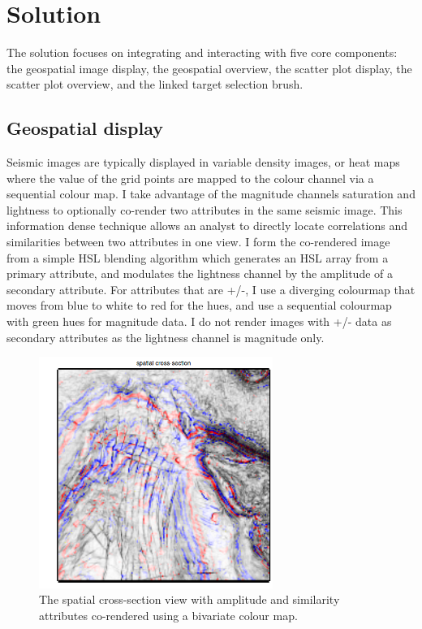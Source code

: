 \documentclass[journal]{vgtc}                %
\begin{document}
\section{Solution}
The solution focuses on integrating and interacting with five core components:
the geospatial image display, the geospatial overview, the scatter plot display,
the scatter plot overview, and the linked target selection brush. 

\subsection{Geospatial display}
Seismic images are typically displayed in variable density images, or heat maps where
the value of the grid points are mapped to the colour channel via a sequential colour map. I take
advantage of the magnitude channels saturation and lightness to optionally co-render two attributes
in the same seismic image. This information dense technique allows an analyst to directly locate
correlations and similarities between two attributes in one view. I form the co-rendered image from
a simple HSL blending algorithm which generates an HSL array from a primary attribute,
and modulates the lightness channel by the amplitude of a secondary attribute.
For attributes that are +/-, I use a diverging colourmap that moves from blue to white to red for the hues, 
and use a sequential colourmap with green hues for magnitude data. I do not render images with +/- data as secondary 
attributes as the lightness channel is magnitude only.

\begin{figure}[htb]
\centering
\includegraphics[width=3in]{corender}
\caption{The spatial cross-section view with amplitude and similarity attributes co-rendered using a bivariate colour map.}
\label{spatial_plot}
\end{figure}
\end{document}
